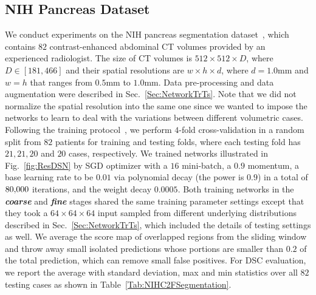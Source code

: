 \documentclass[10pt,twocolumn,letterpaper]{article}
\begin{document}
\subsection{NIH Pancreas Dataset}
We conduct experiments on the NIH pancreas segmentation dataset~\cite{roth2015deeporgan}, which contains $82$ contrast-enhanced abdominal CT volumes provided by an experienced radiologist. The size of CT volumes is $512\times512\times D$, where $D\in [181, 466]$ and their spatial resolutions are $w\times h\times d$, where $d = 1.0\textrm{mm}$ and $w = h$ that ranges from $0.5\textrm{mm}$ to $1.0\textrm{mm}$. Data pre-processing and data augmentation were described in Sec.~\ref{Sec:NetworkTrTs}. Note that we did not normalize the spatial resolution into the same one since we wanted to impose the networks to learn to deal with the variations between different volumetric cases. Following the training protocol~\cite{roth2015deeporgan}, we perform $4$-fold cross-validation in a random split from $82$ patients for training and testing folds, where each testing fold has $21, 21, 20$ and $20$ cases, respectively. We trained networks illustrated in Fig.~\ref{fig:ResDSN} by SGD optimizer with a $16$ mini-batch, a $0.9$ momentum, a base learning rate to be $0.01$ via polynomial decay (the power is $0.9$) in a total of $80\rm{,}000$ iterations, and the weight decay $0.0005$. Both training networks in the \textit{\textbf{coarse}} and \textit{\textbf{fine}} stages shared the same training parameter settings except that they took a $64 \times 64 \times 64$ input sampled from different underlying distributions described in Sec.~\ref{Sec:NetworkTrTs}, which included the details of testing settings as well. We average the score map of overlapped regions from the sliding window and throw away small isolated predictions whose portions are smaller than $0.2$ of the total prediction, which can remove small false positives. For DSC evaluation, we report the average with standard deviation, max and min statistics over all $82$ testing cases as shown in Table~\ref{Tab:NIHC2FSegmentation}.
\end{document}
